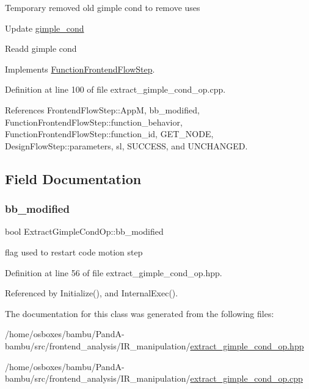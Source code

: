 Temporary removed old gimple cond to remove uses

Update \hyperlink{structgimple__cond}{gimple\+\_\+cond}

Readd gimple cond 

Implements \hyperlink{classFunctionFrontendFlowStep_a00612f7fb9eabbbc8ee7e39d34e5ac68}{Function\+Frontend\+Flow\+Step}.



Definition at line 100 of file extract\+\_\+gimple\+\_\+cond\+\_\+op.\+cpp.



References Frontend\+Flow\+Step\+::\+AppM, bb\+\_\+modified, Function\+Frontend\+Flow\+Step\+::function\+\_\+behavior, Function\+Frontend\+Flow\+Step\+::function\+\_\+id, G\+E\+T\+\_\+\+N\+O\+DE, Design\+Flow\+Step\+::parameters, sl, S\+U\+C\+C\+E\+SS, and U\+N\+C\+H\+A\+N\+G\+ED.



\subsection{Field Documentation}
\mbox{\label{classExtractGimpleCondOp_a446308f9f1e1e19c29156d2f28c19366}} 
\subsubsection{\texorpdfstring{bb\+\_\+modified}{bb\_modified}}
{\footnotesize\ttfamily bool Extract\+Gimple\+Cond\+Op\+::bb\+\_\+modified\hspace{0.3cm}{\ttfamily [private]}}



flag used to restart code motion step 



Definition at line 56 of file extract\+\_\+gimple\+\_\+cond\+\_\+op.\+hpp.



Referenced by Initialize(), and Internal\+Exec().



The documentation for this class was generated from the following files\+:\begin{DoxyCompactItemize}
\item 
/home/osboxes/bambu/\+Pand\+A-\/bambu/src/frontend\+\_\+analysis/\+I\+R\+\_\+manipulation/\hyperlink{extract__gimple__cond__op_8hpp}{extract\+\_\+gimple\+\_\+cond\+\_\+op.\+hpp}\item 
/home/osboxes/bambu/\+Pand\+A-\/bambu/src/frontend\+\_\+analysis/\+I\+R\+\_\+manipulation/\hyperlink{extract__gimple__cond__op_8cpp}{extract\+\_\+gimple\+\_\+cond\+\_\+op.\+cpp}\end{DoxyCompactItemize}
